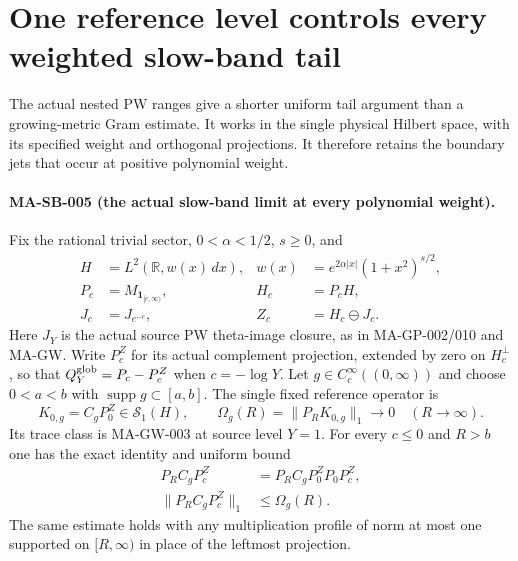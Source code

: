 \section{One reference level controls every weighted slow-band tail}
\label{sec:weighted-slow-band}

The actual nested PW ranges give a shorter uniform tail
argument than a growing-metric Gram estimate.  It works
in the single physical Hilbert space, with its specified
weight and orthogonal projections.  It therefore retains
the boundary jets that occur at positive polynomial weight.

\paragraph{MA-SB-005 (the actual slow-band limit at every polynomial weight).}
Fix the rational trivial sector,
$0<\alpha<1/2$, $s\ge0$, and
\[
 \begin{aligned}
 H&=L^2(\mathbb R,w(x)\,dx),&
 w(x)&=e^{2\alpha|x|}(1+x^2)^{s/2},\\
 P_c&=M_{\mathbf1_{[c,\infty)}},& H_c&=P_cH,\\
 J_c&=J_{e^{-c}},& Z_c&=H_c\ominus J_c.
 \end{aligned}
 \tag{MA-SB.50}
\]
Here $J_Y$ is the actual source PW theta-image closure,
as in MA-GP-002/010 and MA-GW.  Write $P_c^Z$ for
its actual complement projection, extended by zero
on $H_c^\perp$, so that
$Q_Y^{\rm glob}=P_c-P_c^Z$ when $c=-\log Y$.
Let $g\in C_c^\infty((0,\infty))$ and choose
$0<a<b$ with $\operatorname{supp}g\subset[a,b]$.
The single fixed reference operator is
\[
 K_{0,g}=C_gP_0^Z\in\mathcal S_1(H),\qquad
 \Omega_g(R)=\|P_RK_{0,g}\|_1
                       \longrightarrow0\quad(R\to\infty).
 \tag{MA-SB.51}
\]
Its trace class is MA-GW-003 at source level $Y=1$.
For every $c\le0$ and $R>b$ one has the exact identity
and uniform bound
\[
 \begin{aligned}
 P_RC_gP_c^Z&=P_RC_gP_0^ZP_0P_c^Z,\\
 \|P_RC_gP_c^Z\|_1&\le\Omega_g(R).
 \end{aligned}
 \tag{MA-SB.52}
\]
The same estimate holds with any multiplication
profile of norm at most one supported on $[R,\infty)$
in place of the leftmost projection.

